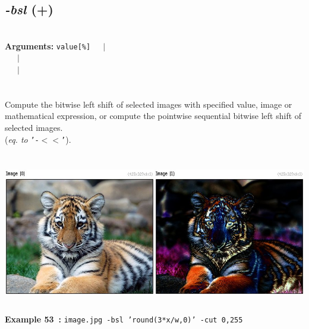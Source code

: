 \documentclass[a4paper,11pt,twoside]{book}
\begin{document}
\subsection{\emph{-bsl} (+)}\vspace*{-0.5em}
~\\\textbf{Arguments: } 
{\small \texttt{value[\%]}}~~~$|$\\
\hspace*{2.2cm}{\small \texttt{[image]}}~~~$|$\\
~~~$|$\\
\\~\\
Compute the bitwise left shift of selected images with specified value, image or
mathematical expression, or compute the pointwise sequential bitwise left shift of
selected images.
~\\(\emph{eq. to} {\small \texttt{'-$<$$<$'}}).
\begin{center}\includegraphics[keepaspectratio=true,height=7cm,width=\textwidth]{img/gmic_def53.jpg}\\
{\footnotesize \textbf{Example 53~:} \texttt{image.jpg -bsl 'round(3*x/w,0)' -cut 0,255}}
\end{center}
\end{document}
